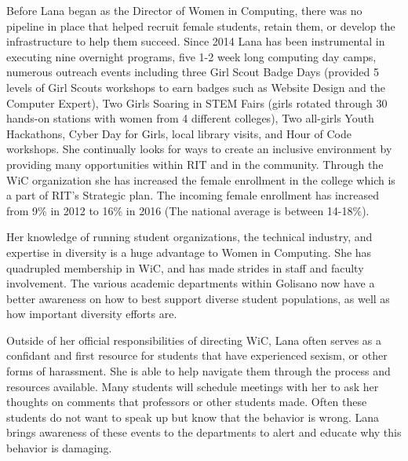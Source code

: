 \documentclass[12pt]{article}
\begin{document}
Before Lana began as the Director of Women in Computing, there was no pipeline in place that helped recruit female students, retain them, or develop the infrastructure to help them succeed. Since 2014 Lana has been instrumental in executing nine overnight programs, five 1-2 week long computing day camps, numerous outreach events including three Girl Scout Badge Days (provided 5 levels of Girl Scouts workshops to earn badges such as Website Design and the Computer Expert), Two Girls Soaring in STEM Fairs (girls rotated through 30 hands-on stations with women from 4 different colleges), Two all-girls Youth Hackathons, Cyber Day for Girls, local library visits, and Hour of Code workshops. She continually looks for ways to create an inclusive environment by providing many opportunities within RIT and in the community. Through the WiC organization she has increased the female enrollment in the college which is a part of RIT’s Strategic plan. The incoming female enrollment has increased from 9\% in 2012 to 16\% in 2016 (The national average is between 14-18\%). 

Her knowledge of running student organizations, the technical industry, and expertise in diversity is a huge advantage to Women in Computing. She has quadrupled membership in WiC, and has made strides in staff and faculty involvement. The various academic departments within Golisano now have a better awareness on how to best support diverse student populations, as well as how important diversity efforts are. 


Outside of her official responsibilities of directing WiC, Lana often serves as a confidant and first resource for students that have experienced sexism, or other forms of harassment. She is able to help navigate them through the process and resources available. Many students will schedule meetings with her to ask her thoughts on comments that professors or other students made. Often these students do not want to speak up but know that the behavior is wrong. Lana brings awareness of these events to the departments to alert and educate why this behavior is damaging. 
\end{document}
